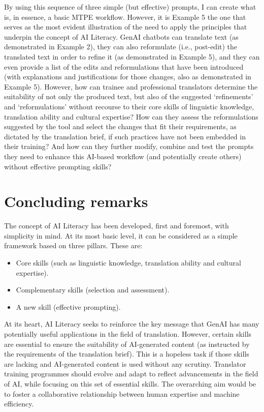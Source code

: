 \documentclass[output=paper]{langscibook}
\begin{document}
By using this sequence of three simple (but effective) prompts, I can create what is, in essence, a basic MTPE workflow. However, it is Example 5 the one that serves as the most evident illustration of the need to apply the principles that underpin the concept of AI Literacy. GenAI chatbots can translate text (as demonstrated in Example 2), they can also reformulate (i.e., post-edit) the translated text in order to refine it (as demonstrated in Example 5), and they can even provide a list of the edits and reformulations that have been introduced (with explanations and justifications for those changes, also as demonstrated in Example 5). However, how can trainee and professional translators determine the suitability of not only the produced text, but also of the suggested ‘refinements’ and ‘reformulations’ without recourse to their core skills of linguistic knowledge, translation ability and cultural expertise? How can they assess the reformulations suggested by the tool and select the changes that fit their requirements, as dictated by the translation brief, if such practices have not been embedded in their training? And how can they further modify, combine and test the prompts they need to enhance this AI-based workflow (and potentially create others) without effective prompting skills?

\section{Concluding remarks}

The concept of AI Literacy has been developed, first and foremost, with simplicity in mind. At its most basic level, it can be considered as a simple framework based on three pillars. These are:

\begin{itemize}
\item  Core skills (such as linguistic knowledge, translation ability and cultural expertise).
\item  Complementary skills (selection and assessment).
\item  A new skill (effective prompting).
\end{itemize}

At its heart, AI Literacy seeks to reinforce the key message that GenAI has many potentially useful applications in the field of translation. However, certain skills are essential to ensure the suitability of AI-generated content (as instructed by the requirements of the translation brief). This is a hopeless task if those skills are lacking and AI-generated content is used without any scrutiny. Translator training programmes should evolve and adapt to reflect advancements in the field of AI, while focusing on this set of essential skills. The overarching aim would be to foster a collaborative relationship between human expertise and machine efficiency.
\end{document}
